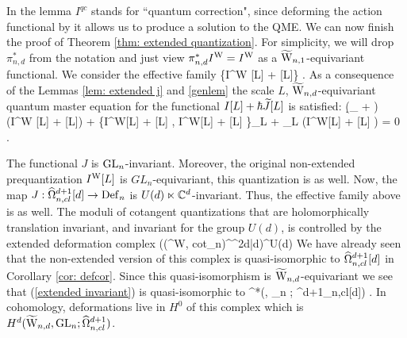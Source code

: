 In the lemma $I^{qc}$ stands for ``quantum correction", since deforming the action functional by it allows us to produce a solution to the QME.
We can now finish the proof of Theorem \ref{thm: extended quantization}.
For simplicity, we will drop $\pi_{n,d}^*$ from the notation and just view $\pi^*_{n,d} I^{\rm W} = I^{\rm W}$ as a $\TVect$-equivariant functional. 
We consider the effective family 
\ben
\{I^{\rm W} [L] + \hbar {}[L]\} .
\een
As a consequence of the Lemmas \ref{lem: extended j} and \ref{genlem} the scale $L$, $\TVectd$-equivariant quantum master equation for the functional $I[L] + \hbar \Tilde{J}[L]$ is satisfied:
\ben
(\d_{} + \dbar) (I^{\rm W} [L] + \hbar {}[L]) + 
\{I^{\rm W}[L] + \hbar {}[L] , I^{\rm W}[L] + \hbar
{}[L] \}_L + \hbar \Delta_L (I^{\rm W}[L] + \hbar {}[L] ) = 0 .
\een 

The functional $J$ is $\GL_n$-invariant.
Moreover, the original non-extended prequantization $I^{\rm W}[L]$ is $GL_n$-equivariant, this quantization is as well.
Now, the map $J : \hOmega^{d+1}_{n,cl}[d] \to \Def_n$ is $U(d) \ltimes \CC^d$-invariant.
Thus, the effective family above is as well. 
The moduli of cotangent quantizations that are holomorphically translation invariant, and invariant for the group $U(d)$, is controlled by the extended deformation complex 
\be\label{extended invariant}
\left(\left(\Tilde{\Def}^{\rm W, cot}_n\right)^{\CC^{2d|d}}\right)^{U(d)}
\ee
We have already seen that the non-extended version of this complex is quasi-isomorphic to $\hOmega^{d+1}_{n,cl}[d]$ in Corollary \ref{cor: defcor}.
Since this quasi-isomorphism is $\TVectd$-equivariant we see that (\ref{extended invariant}) is quasi-isomorphic to 
\ben
\clie^*(\TVectd , \GL_n ; \hOmega^{d+1}_{n,cl}[d]) .
\een
In cohomology, deformations live in $H^0$ of this complex which is $H^{d}(\TVectd , \GL_n ; \hOmega^{d+1}_{n,cl})$.

